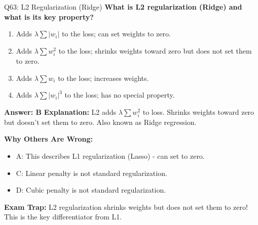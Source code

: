 \documentclass[8pt]{beamer}
\begin{document}
	\begin{frame}{Q63: L2 Regularization (Ridge)}
		\fontsize{6.5}{7.5}\selectfont
		\textbf{What is L2 regularization (Ridge) and what is its key property?}
		
		\begin{enumerate}
			\item Adds $\lambda \sum |w_i|$ to the loss; can set weights to zero.
			\item Adds $\lambda \sum w_i^2$ to the loss; shrinks weights toward zero but does not set them to zero.
			\item Adds $\lambda \sum w_i$ to the loss; increases weights.
			\item Adds $\lambda \sum |w_i|^3$ to the loss; has no special property.
		\end{enumerate}
		
		\vspace{0.05cm}
		\textcolor{myblue}{\textbf{Answer: B}}
		\vspace{0.05cm}
		\textcolor{myblue}{\textbf{Explanation:}} L2 adds $\lambda \sum w_i^2$ to loss. Shrinks weights toward zero but doesn't set them to zero. Also known as Ridge regression.
		
		\vspace{0.05cm}
		\textcolor{myred}{\textbf{Why Others Are Wrong:}}
		\begin{itemize}
			\item \textcolor{myred}{A:} This describes L1 regularization (Lasso) - can set to zero.
			\item \textcolor{myred}{C:} Linear penalty is not standard regularization.
			\item \textcolor{myred}{D:} Cubic penalty is not standard regularization.
		\end{itemize}
		
		\textcolor{myred}{\textbf{Exam Trap:}} L2 regularization \textcolor{myblue}{shrinks weights} but does not set them to zero! This is the key differentiator from L1.
	\end{frame}
	
\end{document}

